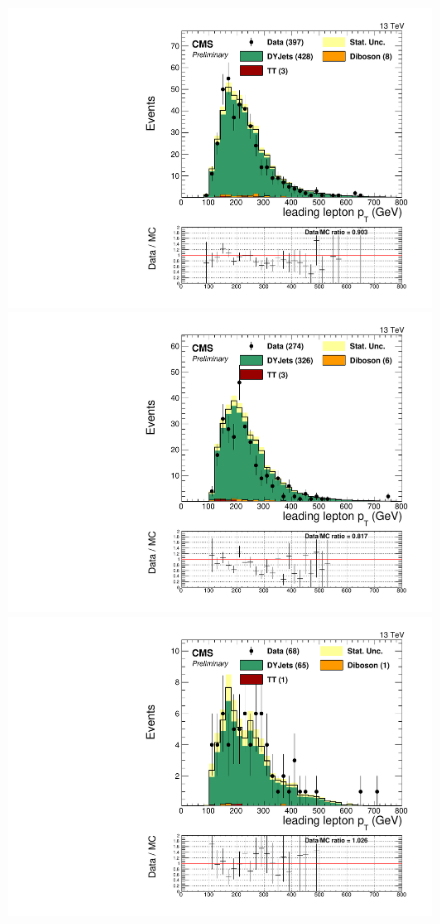\begin{figure}[h]
\begin{center}
\includegraphics[scale=0.37]{figures/control/ptlep1MLP.pdf}
\includegraphics[scale=0.37]{figures/control/ptlep1ELP.pdf}\\[2cm]
\includegraphics[scale=0.37]{figures/control/ptlep1MHP.pdf}

\end{center}
\end{figure}
